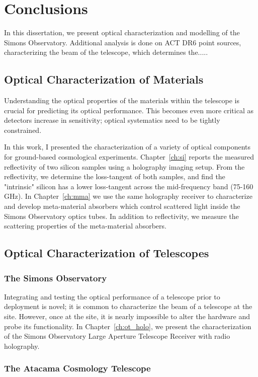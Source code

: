 \chapter{Conclusions}
\label{ch:conclusion}

In this dissertation, we present optical characterization and modelling of the Simons Observatory.  Additional analysis is done on ACT DR6 point sources, characterizing the beam of the telescope, which determines the.....

\section{Optical Characterization of Materials}

Understanding the optical properties of the materials within the telescope is crucial for predicting its optical performance.  This becomes even more critical as detectors increase in sensitivity; optical systematics need to be tightly constrained.

In this work, I presented the characterization of a variety of optical components for ground-based cosmological experiments.  Chapter~\ref{ch:si} reports the measured reflectivity of two silicon samples using a holography imaging setup.  From the reflectivity, we determine the loss-tangent of both samples, and find the "intrinsic" silicon has a lower loss-tangent across the mid-frequency band (75-160\,GHz).  In Chapter~\ref{ch:mma} we use the same holography receiver to characterize and develop meta-material absorbers which control scattered light inside the Simons Observatory optics tubes.  In addition to reflectivity, we measure the scattering properties of the meta-material absorbers. 

\section{Optical Characterization of Telescopes}
\subsection{The Simons Observatory}
Integrating and testing the optical performance of a telescope prior to deployment is novel; it is common to characterize the beam of a telescope at the site.  However, once at the site, it is nearly impossible to alter the hardware and probe its functionality.  In Chapter~\ref{ch:ot_holo}, we present the characterization of the Simons Observatory Large Aperture Telescope Receiver with radio holography.

\subsection{The Atacama Cosmology Telescope}